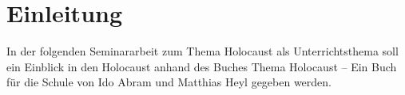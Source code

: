 \section{Einleitung} 
In der folgenden Seminararbeit zum Thema \glqq Holocaust als Unterrichtsthema\grqq{} soll ein Einblick in den Holocaust anhand des Buches \glqq Thema Holocaust – Ein Buch für die Schule\grqq{} von Ido Abram und Matthias Heyl gegeben werden.
